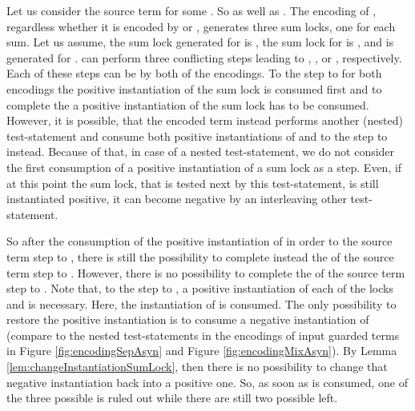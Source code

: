 \documentclass[]{llncs}
\begin{document}
\begin{example} \label{exa:intermediateStates}
	Let us consider the source term  for some . So  as well as . The encoding of , regardless whether it is encoded by  or , generates three sum locks, one for each sum. Let us assume, the sum lock generated for  is , the sum lock for  is , and  is generated for .  can perform three conflicting steps leading to , , or , respectively. Each of these steps can be \simulated by both of the encodings. To \simulate the step to  for both encodings the positive instantiation of the sum lock  is consumed first and to complete the \simulation a positive instantiation of the sum lock  has to be consumed. However, it is possible, that the encoded term instead performs another (nested) test-statement and consume both positive instantiations of  and  to \simulate the step to  instead. Because of that, in case of a nested test-statement, we do not consider the first consumption of a positive instantiation of a sum lock as a \nonAdmin step. Even, if at this point the sum lock, that is tested next by this test-statement, is still instantiated positive, it can become negative by an interleaving other test-statement.
	
	So after the consumption of the positive instantiation of  in order to \simulate the source term step to , there is still the possibility to complete instead the \simulation of the source term step to . However, there is no possibility to complete the \simulation of the source term step to . Note that, to \simulate the step to , a positive instantiation of each of the locks  and  is necessary. Here, the instantiation of  is consumed. The only possibility to restore the positive instantiation is to consume a negative instantiation of  (compare to the nested test-statements in the encodings of input guarded terms in Figure \ref{fig:encodingSepAsyn} and Figure \ref{fig:encodingMixAsyn}). By Lemma \ref{lem:changeInstantiationSumLock}, then there is no possibility to change that negative instantiation back into a positive one. So, as soon as  is consumed, one of the three possible \simulations is ruled out while there are still two possible \simulations left.
\end{example}
\end{document}

